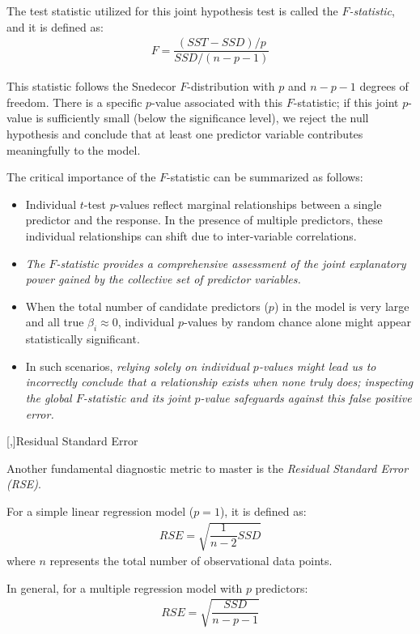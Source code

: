 The test statistic utilized for this joint hypothesis test is called the \emph{$F$-statistic}, and it is defined as:
\begin{align}
	F = \dfrac{\left( SST - SSD \right) / p}{SSD / \left( n - p - 1 \right)}
\end{align}

This statistic follows the Snedecor $F$-distribution with $p$ and $n - p - 1$ degrees of freedom.
There is a specific $p$-value associated with this $F$-statistic; if this joint $p$-value is sufficiently small (below the significance level), we reject the null hypothesis and conclude that at least one predictor variable contributes meaningfully to the model.

The critical importance of the $F$-statistic can be summarized as follows:
\begin{itemize}
	\item Individual $t$-test $p$-values reflect marginal relationships between a single predictor and the response. In the presence of multiple predictors, these individual relationships can shift due to inter-variable correlations.
	\item \emph{The $F$-statistic provides a comprehensive assessment of the joint explanatory power gained by the collective set of predictor variables.}
	\item When the total number of candidate predictors ($p$) in the model is very large and all true $\beta_i \approx 0$, individual $p$-values by random chance alone might appear statistically significant.
	\item In such scenarios, \emph{relying solely on individual $p$-values might lead us to incorrectly conclude that a relationship exists when none truly does; inspecting the global $F$-statistic and its joint $p$-value safeguards against this false positive error.}
\end{itemize}

[,]{Residual Standard Error}

Another fundamental diagnostic metric to master is the \emph{Residual Standard Error (RSE)}.

For a simple linear regression model ($p = 1$), it is defined as:
\begin{align}
	RSE = \sqrt{\dfrac{1}{n - 2} SSD}
\end{align}
where $n$ represents the total number of observational data points.

In general, for a multiple regression model with $p$ predictors:
\begin{align}
	RSE = \sqrt{\dfrac{SSD}{n - p - 1}}
\end{align}

